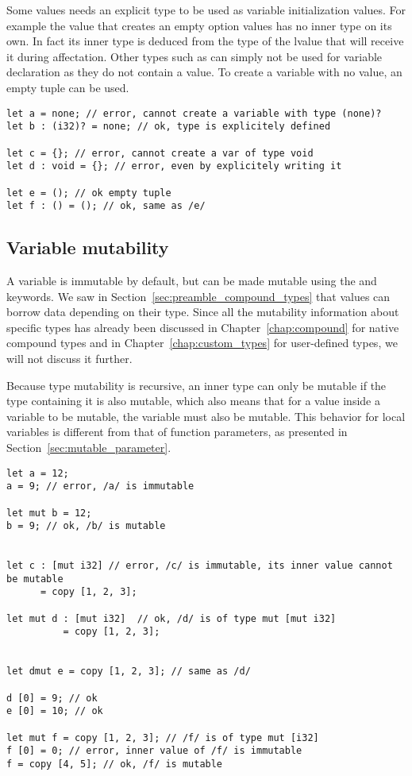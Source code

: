Some values needs an explicit type to be used as variable initialization values. For example the value  that creates an empty option values has no inner type on its own. In fact its inner type is deduced from the type of the lvalue that will receive it during affectation. Other types such as  can simply not be used for variable declaration as they do not contain a value. To create a variable with no value, an empty tuple \token{()} can be used.

\begin{lstlisting}[style=coloredverbatim]
let a = none; // error, cannot create a variable with type (none)?
let b : (i32)? = none; // ok, type is explicitely defined

let c = {}; // error, cannot create a var of type void
let d : void = {}; // error, even by explicitely writing it

let e = (); // ok empty tuple
let f : () = (); // ok, same as /e/
\end{lstlisting}

\subsection {Variable mutability}

A variable is immutable by default, but can be made mutable using the
 and  keywords. We saw in
Section~\ref{sec:preamble_compound_types} that values can borrow data depending
on their type. Since all the mutability information about specific types has
already been discussed in Chapter~\ref{chap:compound} for native compound types
and in Chapter~\ref{chap:custom_types} for user-defined types, we will not
discuss it further.

Because type mutability is recursive, an inner type can only be mutable if the
type containing it is also mutable, which also means that for a value inside a
variable to be mutable, the variable must also be mutable. This behavior for
local variables is different from that of function parameters, as presented in
Section~\ref{sec:mutable_parameter}.

\begin{lstlisting}[style=coloredverbatim]
let a = 12;
a = 9; // error, /a/ is immutable

let mut b = 12;
b = 9; // ok, /b/ is mutable


let c : [mut i32] // error, /c/ is immutable, its inner value cannot be mutable
      = copy [1, 2, 3];

let mut d : [mut i32]  // ok, /d/ is of type mut [mut i32]
          = copy [1, 2, 3];


let dmut e = copy [1, 2, 3]; // same as /d/

d [0] = 9; // ok
e [0] = 10; // ok

let mut f = copy [1, 2, 3]; // /f/ is of type mut [i32]
f [0] = 0; // error, inner value of /f/ is immutable
f = copy [4, 5]; // ok, /f/ is mutable
\end{lstlisting}

